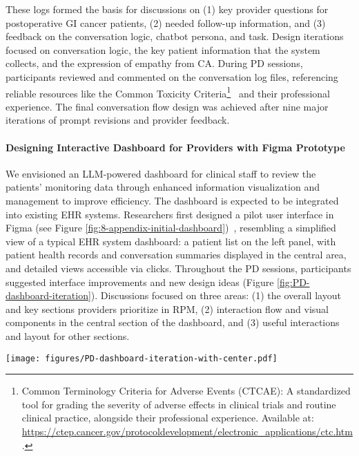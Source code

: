 These logs formed the basis for discussions on (1) key provider questions for postoperative GI cancer patients, (2) needed follow-up information, and (3) feedback on the conversation logic, chatbot persona, and task. Design iterations focused on conversation logic, the key patient information that the system collects, and the expression of empathy from CA.
During PD sessions, participants reviewed and commented on the conversation log files, referencing reliable resources like the Common Toxicity Criteria\footnote{Common Terminology Criteria for Adverse Events (CTCAE): A standardized tool for grading the severity of adverse effects in clinical trials and routine clinical practice, alongside their professional experience. Available at: \url{https://ctep.cancer.gov/protocoldevelopment/electronic_applications/ctc.htm}. }~\cite{CommonTerminologyCriteria} and their professional experience. The final conversation flow design was achieved after nine major iterations of prompt revisions and provider feedback.


\paragraph{Designing Interactive Dashboard for Providers with Figma Prototype}
We envisioned an LLM-powered dashboard for clinical staff to review the patients' monitoring data through enhanced information visualization and management to improve efficiency. 
The dashboard is expected to be integrated into existing EHR systems. Researchers first designed a pilot user interface in Figma (see Figure \ref{fig:8-appendix-initial-dashboard})~\cite{figma}, resembling a simplified view of a typical EHR system dashboard: a patient list on the left panel, with patient health records and conversation summaries displayed in the central area, and detailed views accessible via clicks.
Throughout the PD sessions, participants suggested interface improvements and new design ideas (Figure \ref{fig:PD-dashboard-iteration}). Discussions focused on three areas: (1) the overall layout and key sections providers prioritize in RPM, (2) interaction flow and visual components in the central section of the dashboard, and (3) useful interactions and layout for other sections.

\begin{figure*}[p]
    \centering
    \texttt{[image: figures/PD-dashboard-iteration-with-center.pdf]}
    \captionsetup{justification=centerlast}
    \caption{Dashboard Iteration Process. In each section, we present the key design versions of the corresponding module, together with the provider feedback that we gathered in the PD sessions. The provider's feedback guided us through the design iterations.}
    \label{fig:PD-dashboard-iteration}
\end{figure*}


